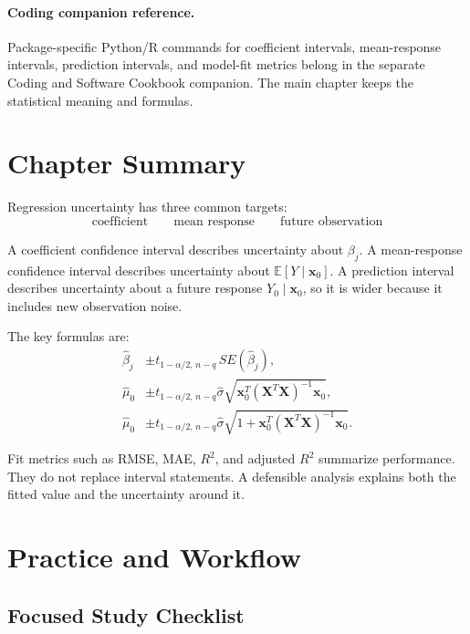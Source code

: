 \paragraph{Coding companion reference.}
Package-specific Python/R commands for coefficient intervals, mean-response intervals, prediction intervals, and model-fit metrics belong in the separate Coding and Software Cookbook companion.  The main chapter keeps the statistical meaning and formulas.

\section{Chapter Summary}

Regression uncertainty has three common targets:
\begin{equation}
  \boxed{
  \text{coefficient} \qquad \text{mean response} \qquad \text{future observation}
  }
\end{equation}

A coefficient confidence interval describes uncertainty about \(\beta_j\).  A mean-response confidence interval describes uncertainty about \(\mathbb{E}[Y\mid\mathbf{x}_0]\).  A prediction interval describes uncertainty about a future response \(Y_0\mid\mathbf{x}_0\), so it is wider because it includes new observation noise.

The key formulas are:
\begin{align}
  \widehat{\beta}_j
  &\pm t_{1-\alpha/2,\,n-q}\,SE(\widehat{\beta}_j),\\
  \widehat{\mu}_0
  &\pm t_{1-\alpha/2,\,n-q}\widehat{\sigma}
  \sqrt{\mathbf{x}_0^T(\mathbf{X}^T\mathbf{X})^{-1}\mathbf{x}_0},\\
  \widehat{\mu}_0
  &\pm t_{1-\alpha/2,\,n-q}\widehat{\sigma}
  \sqrt{1+\mathbf{x}_0^T(\mathbf{X}^T\mathbf{X})^{-1}\mathbf{x}_0}.
\end{align}

Fit metrics such as RMSE, MAE, \(R^2\), and adjusted \(R^2\) summarize performance.  They do not replace interval statements.  A defensible analysis explains both the fitted value and the uncertainty around it.

\section{Practice and Workflow}
\subsection*{Focused Study Checklist}


